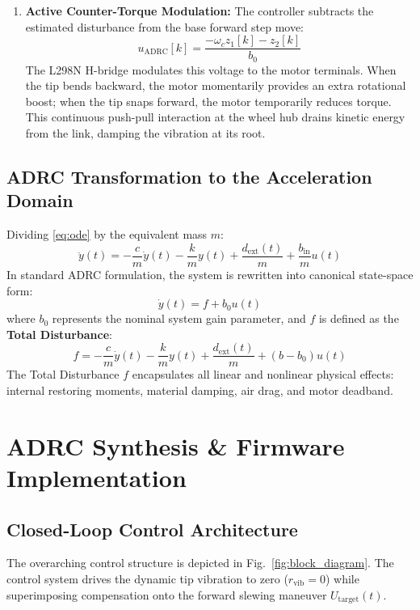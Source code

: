 \documentclass[conference]{IEEEtran}
\begin{document}
\begin{enumerate}
    \item \textbf{Active Counter-Torque Modulation:} The controller subtracts the estimated disturbance from the base forward step move:
    \begin{equation}
    u_{\text{ADRC}}[k] = \frac{-\omega_c z_1[k] - z_2[k]}{b_0}
    \end{equation}
    The L298N H-bridge modulates this voltage to the motor terminals. When the tip bends backward, the motor momentarily provides an extra rotational boost; when the tip snaps forward, the motor temporarily reduces torque. This continuous push-pull interaction at the wheel hub drains kinetic energy from the link, damping the vibration at its root.
\end{enumerate}

\subsection{ADRC Transformation to the Acceleration Domain}
Dividing \eqref{eq:ode} by the equivalent mass $m$:
\begin{equation}
\ddot{y}(t) = -\frac{c}{m}\dot{y}(t) - \frac{k}{m}y(t) + \frac{d_{\text{ext}}(t)}{m} + \frac{b_{\text{in}}}{m}u(t)
\end{equation}
In standard ADRC formulation, the system is rewritten into canonical state-space form:
\begin{equation}
\dot{y}(t) = f + b_0 u(t)
\label{eq:canonical}
\end{equation}
where $b_0$ represents the nominal system gain parameter, and $f$ is defined as the \textbf{Total Disturbance}:
\begin{equation}
f = -\frac{c}{m}\dot{y}(t) - \frac{k}{m}y(t) + \frac{d_{\text{ext}}(t)}{m} + (b - b_0)u(t)
\label{eq:total_dist}
\end{equation}
The Total Disturbance $f$ encapsulates all linear and nonlinear physical effects: internal restoring moments, material damping, air drag, and motor deadband.

\section{ADRC Synthesis \& Firmware Implementation}

\subsection{Closed-Loop Control Architecture}
The overarching control structure is depicted in Fig.~\ref{fig:block_diagram}. The control system drives the dynamic tip vibration to zero ($r_{\text{vib}} = 0$) while superimposing compensation onto the forward slewing maneuver $U_{\text{target}}(t)$.
\end{document}
